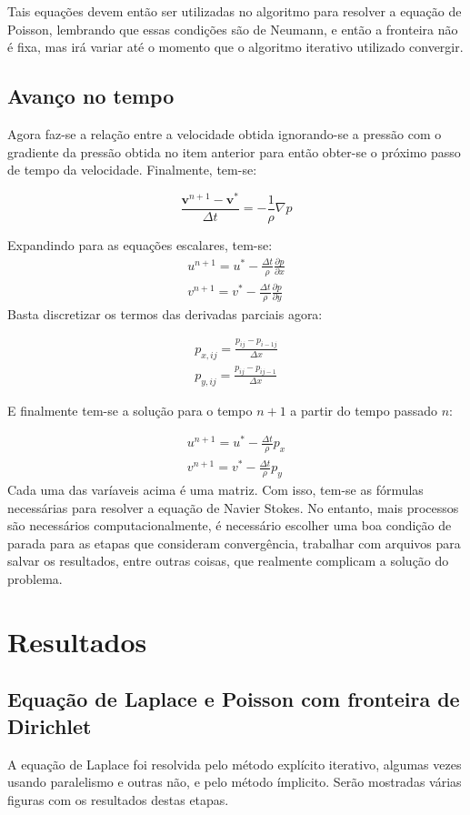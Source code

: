 \documentclass[journal]{IEEEtran}
\begin{document}
Tais equações devem então ser utilizadas no algoritmo para resolver a equação de Poisson, lembrando que essas condições são de Neumann, e então a fronteira não é fixa, mas irá variar até o momento que o algoritmo iterativo utilizado convergir.
\subsection{Avanço no tempo}
Agora faz-se a relação entre a velocidade obtida ignorando-se a pressão com o gradiente da pressão obtida no item anterior para então obter-se o próximo passo de tempo da velocidade. Finalmente, tem-se: 

\begin{equation}
\frac{\textbf{v}^{n+1}-\textbf{v}^*}{\Delta t}=-\frac{1}{\rho}\nabla p
\end{equation}

Expandindo para as equações escalares, tem-se:
\begin{eqnarray}
u^{n+1}=u^*-\frac{\Delta t}{\rho}\frac{\partial p}{\partial x}\\
v^{n+1}=v^*-\frac{\Delta t}{\rho}\frac{\partial p}{\partial y}
\end{eqnarray}
Basta discretizar os termos das derivadas parciais agora:

\begin{eqnarray}
p_{x,ij}=\frac{p_{ij}-p_{i-1j}}{\Delta x}\\
p_{y,ij}=\frac{p_{ij}-p_{ij-1}}{\Delta x}
\end{eqnarray}

E finalmente tem-se a solução para o tempo $n+1$ a partir do tempo passado $n$:

\begin{eqnarray}
u^{n+1}=u^*-\frac{\Delta t}{\rho}p_x\\
v^{n+1}=v^*-\frac{\Delta t}{\rho}p_y
\end{eqnarray}
Cada uma das varíaveis acima é uma matriz. Com isso, tem-se as fórmulas necessárias para resolver a equação de Navier Stokes. No entanto, mais processos são necessários computacionalmente, é necessário escolher uma boa condição de parada para as etapas que consideram convergência, trabalhar com arquivos para salvar os resultados, entre outras coisas, que realmente complicam a solução do problema.
\section{Resultados}
\subsection{Equação de Laplace e Poisson com fronteira de Dirichlet}
A equação de Laplace foi resolvida pelo método explícito iterativo, algumas vezes usando paralelismo e outras não, e pelo método ímplicito. Serão mostradas várias figuras com os resultados destas etapas.
\end{document}
